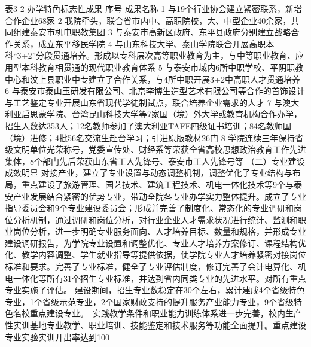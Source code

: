 表3-2  办学特色标志性成果
序号
成果名称
1
与19个行业协会建立紧密联系，新增合作企业68家
2
我院牵头，联合省市内中、高职院校，大、中型企业40余家，共同组建泰安市机电职教集团
3
与泰安市高新区政府、东平县政府分别建立战略合作关系，成立东平移民学院
4
与山东科技大学、泰山学院联合开展高职本科“3+2”分段贯通培养。形成以专科层次高等职业教育为主，与中等职业教育、应用型本科教育相贯通的现代职业教育体系
5
与泰安市域内6所中职学校、平阴职教中心和汶上县职业中专建立了合作关系，与4所中职开展3+2中高职人才贯通培养
6
与泰安市泰山玉研发有限公司、北京李博生造型艺术有限公司等合作的首饰设计与工艺鉴定专业开展山东省现代学徒制试点，联合培养企业需求的人才
7
与澳大利亚启思蒙学院、台湾昆山科技大学等7家国（境）外大学或教育机构合作办学，招生人数达353人；12名教师参加了澳大利亚TAFE四级证书培训；84名教师国（境）进修；4批56名交流生赴台学习；引进原版教材26门
8
学院连续三年保持省级文明单位光荣称号，党委宣传处、财经系等荣获全省高校思想政治教育工作先进集体，8个部门先后荣获山东省工人先锋号、泰安市工人先锋号等
（二）专业建设成效明显
对接产业，建立了专业设置与动态调整机制，调整优化了专业结构与布局，重点建设了旅游管理、园艺技术、建筑工程技术、机电一体化技术等9个与泰安产业发展结合紧密的优势专业，带动全院各专业办学实力整体提升。成立了专业指导委员会和9个专业建设委员会；形成并完善了制度化、常态化的专业调研和岗位分析机制，通过调研和岗位分析，对行业企业人才需求状况进行统计、监测和职业岗位分析，进一步明确专业服务面向、人才培养目标、数量和规格，并形成专业建设调研报告，为学院专业设置和调整优化、专业人才培养方案修订、课程结构优化、教学内容调整、学生就业指导等提供依据，使学院专业人才培养紧密对接岗位标准和要求。完善了专业标准，健全了专业评估制度，修订完善了会计电算化、机电一体化等所有31个招生专业标准，并达到省内同类专业的先进水平。对所有重点专业实施了评估。
建设期间，招生专业数稳定在30个左右，累计建成4个省级特色专业，1个省级示范专业，2个国家财政支持的提升服务产业能力专业，9个省级特色名校重点建设专业。　实践教学条件和职业能力训练体系进一步完善，校内生产性实训基地专业教学、职业培训、技能鉴定和技术服务等功能全面提升。重点建设专业实验实训开出率达到100%

